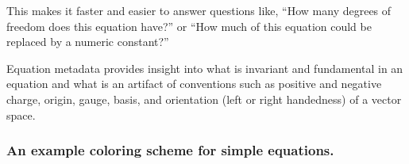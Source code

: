 \documentclass[12pt,letterpaper]{article}
\begin{document}
This makes it faster and easier to answer questions like,
``How many degrees of freedom does this equation have?''
or
``How much of this equation could be replaced by a numeric constant?''

Equation metadata provides insight into what is invariant and fundamental in an equation
and what is an artifact of conventions such as positive and negative charge,
origin, gauge, basis, and orientation (left or right handedness) of a vector space.

\subsubsection{An example coloring scheme for simple equations.}

\boldmath

\newcommand{\op}{\textcolor{Plum}} %
\newcommand{\fv}{\textcolor{green}} %
\newcommand{\iv}{\textcolor{red}} %
\newcommand{\fc}{\textcolor{blue}} %
\newcommand{\bv}{\textcolor{Gray}} %
\newcommand{\nt}{\textcolor{black}} %


\end{document}
